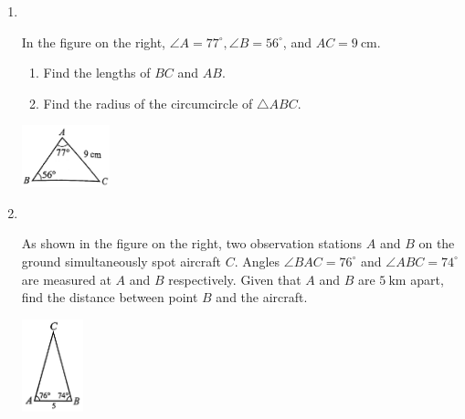 \documentclass{report}
\begin{document}

    \begin{enumerate}
        \item \parbox[t]{0.9\textwidth}{
            ~
            \vspace{-1.1em}
            \begin{vwcol}[widths={0.7,0.3}, sep=8mm, rule=0pt]
                In the figure on the right, $\angle A = 77^\circ, \angle B = 56^\circ$, and $AC = 9 \mathrm{~cm}$.

                \noindent\parbox{0.5\textwidth}{
                    \begin{enumerate}
                        \item Find the lengths of $BC$ and $AB$.
            
                        \item Find the radius of the circumcircle of $\triangle ABC$.
                    \end{enumerate}
                }
    
                \includegraphics[width=0.2\textwidth]{assets/10-14.jpg}
            \end{vwcol}
        }

        \item \parbox[t]{0.9\textwidth}{
            ~
            \vspace{-1.1em}
            \begin{vwcol}[widths={0.7,0.3}, sep=8mm, rule=0pt]
                As shown in the figure on the right, two observation stations $A$ and $B$ on the ground simultaneously spot aircraft $C$. Angles $\angle BAC = 76^\circ$ and $\angle ABC = 74^\circ$ are measured at $A$ and $B$ respectively. Given that $A$ and $B$ are $5 \mathrm{~km}$ apart, find the distance between point $B$ and the aircraft.
    
                \includegraphics[width=0.14\textwidth]{assets/10-15.jpg}
            \end{vwcol}
        }


\end{enumerate}
\end{document}
